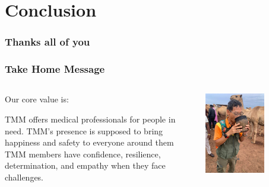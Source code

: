 \documentclass[aspectratio=169]{beamer}
\begin{document}
\section{Conclusion}
\begin{frame}
\frametitle{Thanks all of you}
\begin{center}

\end{center}
\end{frame}


\begin{frame}
\frametitle{Take Home Message}
\begin{columns}
    
\begin{outline}
    Our core value is:

\1 TMM offers medical professionals for people in need.
\1 TMM's presence is supposed to bring happiness and safety to everyone around them
\1 TMM members have confidence, resilience, determination, and empathy when they face challenges.
\end{outline}

\includegraphics[width=0.6\textwidth]{IMG-0394.JPG}
\end{columns}
\end{frame}
\end{document}
